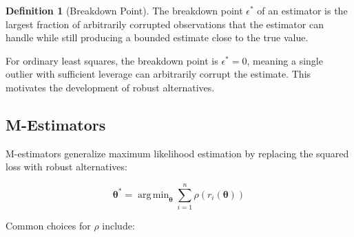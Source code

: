 \documentclass[12pt]{article}
\DeclareMathOperator{\argmin}{arg\,min}
\renewcommand{\vec}[1]{\mathbf{#1}}
\theoremstyle{definition}
\newtheorem{definition}{Definition}[section]
\begin{document}
\begin{definition}[Breakdown Point]
    The breakdown point $\epsilon^*$ of an estimator is the largest fraction of arbitrarily corrupted observations that the estimator can handle while still producing a bounded estimate close to the true value.
\end{definition}

For ordinary least squares, the breakdown point is $\epsilon^* = 0$, meaning a single outlier with sufficient leverage can arbitrarily corrupt the estimate. This motivates the development of robust alternatives.

\subsection{M-Estimators}

M-estimators generalize maximum likelihood estimation by replacing the squared loss with robust alternatives:

\begin{equation}
    \vec{\theta}^* = \argmin_{\vec{\theta}} \sum_{i=1}^n \rho(r_i(\vec{\theta}))
\end{equation}

Common choices for $\rho$ include:
\end{document}
